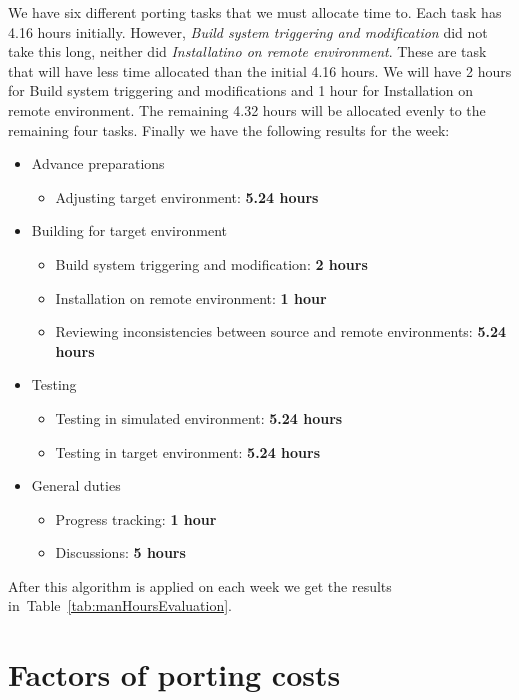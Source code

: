 We have six different porting tasks that we must allocate time to. Each task has
4.16 hours initially. However, \textit{Build system triggering and modification}
did not take this long, neither did \textit{Installatino on remote environment}.
These are task that will have less time allocated than the initial 4.16 hours.
We will have 2 hours for Build system triggering and modifications and 1 hour
for Installation on remote environment. The remaining 4.32 hours will be
allocated evenly to the remaining four tasks. Finally we have the following
results for the week:
\begin{itemize}
    \item Advance preparations
        \begin{itemize}
            \item Adjusting target environment: \textbf{5.24 hours}
        \end{itemize}
    \item Building for target environment
        \begin{itemize}
            \item Build system triggering and modification: \textbf{2 hours}
            \item Installation on remote environment: \textbf{1 hour}
            \item Reviewing inconsistencies between source and remote
            environments: \textbf{5.24 hours}
        \end{itemize}
    \item Testing
        \begin{itemize}
            \item Testing in simulated environment: \textbf{5.24 hours}
            \item Testing in target environment: \textbf{5.24 hours}
        \end{itemize}
    \item General duties
        \begin{itemize}
            \item Progress tracking: \textbf{1 hour}
            \item Discussions: \textbf{5 hours}
        \end{itemize}
\end{itemize}

After this algorithm is applied on each week we get the results in~Table~\ref{tab:manHoursEvaluation}.

\section{Factors of porting costs}

